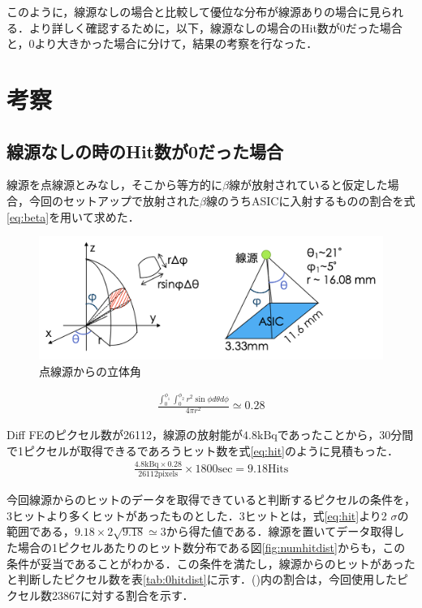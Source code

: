 このように，線源なしの場合と比較して優位な分布が線源ありの場合に見られる．より詳しく確認するために，以下，線源なしの場合のHit数が0だった場合と，0より大きかった場合に分けて，結果の考察を行なった．

\section{考察}
\label{sec:selfsum}
\subsection*{線源なしの時のHit数が0だった場合}
線源を点線源とみなし，そこから等方的に$\beta$線が放射されていると仮定した場合，今回のセットアップで放射された$\beta$線のうちASICに入射するものの割合を式\ref{eq:beta}を用いて求めた．

\begin{figure}[h]
  \centering
  \includegraphics[width=12cm]{./figure/selfarc.png}
  \caption{点線源からの立体角}
\end{figure}

\begin{eqnarray}
  \label{eq:beta}
  \frac{\int^{\phi_1}_0 \int^{\phi_2}_0 r^2 \sin \phi d\theta d\phi}{4 \pi r^2} \simeq 0.28
\end{eqnarray}

Diff FEのピクセル数が26112，線源の放射能が$4.8 \mathrm{kBq}$であったことから，30分間で1ピクセルが取得できるであろうヒット数を式\ref{eq:hit}のように見積もった．
\begin{eqnarray}
  \label{eq:hit}
  \frac{4.8 \mathrm{kBq} \times 0.28}{26112 \mathrm{pixels}} \times 1800 \mathrm{sec} = 9.18 \mathrm{Hits}
\end{eqnarray}

今回線源からのヒットのデータを取得できていると判断するピクセルの条件を，3ヒットより多くヒットがあったものとした．3ヒットとは，式\ref{eq:hit}より2 $\sigma$の範囲である，$9.18 \times 2 \sqrt{9.18} \simeq 3$から得た値である．線源を置いてデータ取得した場合の1ピクセルあたりのヒット数分布である図\ref{fig:numhitdist}からも，この条件が妥当であることがわかる．この条件を満たし，線源からのヒットがあったと判断したピクセル数を表\ref{tab:0hitdist}に示す．()内の割合は，今回使用したピクセル数23867に対する割合を示す．

